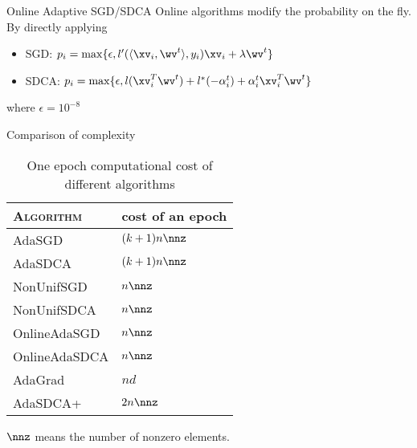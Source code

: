\begin{frame}{Online Adaptive SGD/SDCA}
Online algorithms modify the probability on the fly. By directly applying
\begin{itemize}
    \item SGD: $p_i = \max\{\epsilon, l'(\langle \xv_i, \wv^t\rangle, y_i)\xv_i+\lambda           \wv^t\}$
    \item SDCA: $p_i = \max\{\epsilon, l(\xv_i^T\wv^t)+l^*(-\alpha_i^t)+                            \alpha_i^t\xv_i^T\wv^t\}$
\end{itemize}
where $\epsilon = 10^{-8}$
\end{frame}

\begin{frame}{Comparison of complexity}
\begin{table}[htbp!]
    \centering
    \caption{One epoch computational cost of different algorithms}
    \label{table:compcost}
    \begin{tabular}{|l|l|}
        \hline
        \textsc{Algorithm} & cost of an epoch\\ 
        \hline
        AdaSGD & $(k+1)n\nnz$ \\
        AdaSDCA & $(k+1)n\nnz$ \\
        NonUnifSGD & $n\nnz$ \\
        NonUnifSDCA & $n\nnz$\\
        OnlineAdaSGD & $n\nnz$\\
        OnlineAdaSDCA & $n\nnz$\\
        AdaGrad & {\color{red}$nd$}\\
        AdaSDCA+ & $2n\nnz$ \\
        \hline
    \end{tabular}
\end{table}
$\nnz$ means the number of nonzero elements.
\end{frame}
